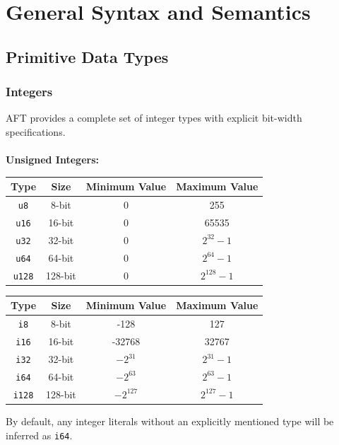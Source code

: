 \section{General Syntax and Semantics}
\subsection{Primitive Data Types}
\subsubsection{Integers}
AFT provides a complete set of integer types with explicit bit-width specifications. \\\\
\textbf{Unsigned Integers:}
\begin{table}[H]
    \centering
    \begin{tabular}{cccc}
        \hline
        \textbf{Type} & \textbf{Size} & \textbf{Minimum Value} & \textbf{Maximum Value} \\
        \hline
        \texttt{u8} & 8-bit & 0 & 255 \\
        \texttt{u16} & 16-bit & 0 & 65535 \\
        \texttt{u32} & 32-bit & 0 & $2^{32} - 1$ \\
        \texttt{u64} & 64-bit & 0 & $2^{64} - 1$ \\
        \texttt{u128} & 128-bit & 0 & $2^{128} - 1$ \\
        \hline
    \end{tabular}
\end{table}
\begin{table}[H]
    \centering
    \begin{tabular}{cccc}
        \hline
        \textbf{Type} & \textbf{Size} & \textbf{Minimum Value} & \textbf{Maximum Value} \\
        \hline
        \texttt{i8} & 8-bit & -128 & 127 \\
        \texttt{i16} & 16-bit & -32768 & 32767 \\
        \texttt{i32} & 32-bit & $-2^{31}$ & $2^{31} - 1$ \\
        \texttt{i64} & 64-bit & $-2^{63}$ & $2^{63} - 1$ \\
        \texttt{i128} & 128-bit & $-2^{127}$ & $2^{127} - 1$ \\
        \hline
    \end{tabular}
\end{table}
By default, any integer literals without an explicitly mentioned type will be inferred as \texttt{i64}.


